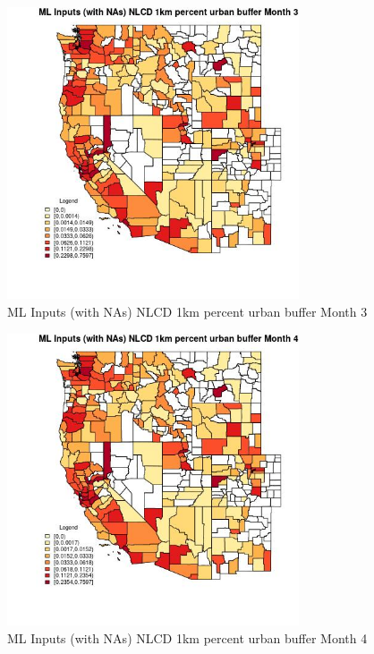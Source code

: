 \begin{figure} 
\centering  
\includegraphics[width=0.77\textwidth]{Code_Outputs/Report_ML_input_PM25_Step4_part_e_de_duplicated_aves_compiled_2019-05-21wNAs_CountyNLCD_1km_percent_urban_buffermedianMonth3.jpg} 
\caption{\label{fig:Report_ML_input_PM25_Step4_part_e_de_duplicated_aves_compiled_2019-05-21wNAsCountyNLCD_1km_percent_urban_buffermedianMonth3}ML Inputs (with NAs) NLCD 1km percent urban buffer Month 3} 
\end{figure} 
 

\begin{figure} 
\centering  
\includegraphics[width=0.77\textwidth]{Code_Outputs/Report_ML_input_PM25_Step4_part_e_de_duplicated_aves_compiled_2019-05-21wNAs_CountyNLCD_1km_percent_urban_buffermedianMonth4.jpg} 
\caption{\label{fig:Report_ML_input_PM25_Step4_part_e_de_duplicated_aves_compiled_2019-05-21wNAsCountyNLCD_1km_percent_urban_buffermedianMonth4}ML Inputs (with NAs) NLCD 1km percent urban buffer Month 4} 
\end{figure} 
 

